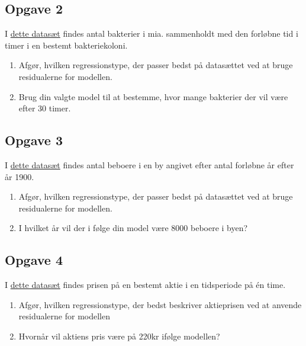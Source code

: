 \documentclass[12pt]{article}
\begin{document}
\subsection*{Opgave 2}

I \href{https://github.com/ChristianJLex/TeachingNotes/raw/master/2023-2024/Data%20og%20lign/bakterierResidual.xlsx}{\color{blue!60} dette datasæt} findes antal bakterier i mia. sammenholdt med den forløbne tid i timer i en bestemt bakteriekoloni. 

\begin{enumerate}[label=\roman*)]
	\item Afgør, hvilken regressionstype, der passer bedst på datasættet ved at bruge 
	residualerne for modellen.
	\item Brug din valgte model til at bestemme, hvor mange bakterier der vil være efter 30 
	timer.
\end{enumerate}

\subsection*{Opgave 3}

I \href{https://github.com/ChristianJLex/TeachingNotes/raw/master/2023-2024/Data%20og%20lign/beboereResidual.xlsx}{\color{blue!60} dette datasæt} findes antal beboere i en by angivet efter antal forløbne år efter år 1900.

\begin{enumerate}[label=\roman*)]
	\item Afgør, hvilken regressionstype, der passer bedst på datasættet ved at bruge 
	residualerne for modellen.
	\item I hvilket år vil der i følge din model være 8000 beboere i byen?
\end{enumerate}

\subsection*{Opgave 4}

I \href{https://github.com/ChristianJLex/TeachingNotes/raw/master/2023-2024/Data%20og%20lign/aktieResidual.xlsx}{\color{blue!60} dette datasæt} findes prisen på en bestemt aktie i en tidsperiode på én time.

\begin{enumerate}[label=\roman*)]
	\item Afgør, hvilken regressionstype, der bedst beskriver aktieprisen ved at anvende residualerne for modellen
	\item Hvornår vil aktiens pris være på 220kr ifølge modellen?
\end{enumerate}
\end{document}
